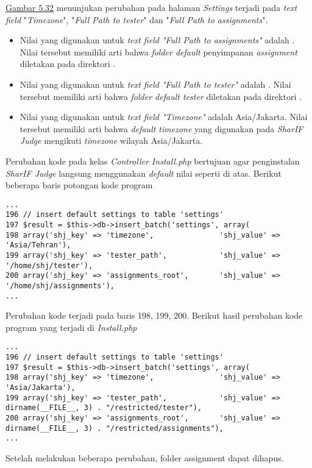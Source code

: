 	\hyperref[fig:set]{Gambar 5.32} menunjukan perubahan pada halaman \textit{Settings} terjadi pada \textit{text field} "\textit{Timezone}", "\textit{Full Path to tester}" dan "\textit{Full Path to assignments}". 
	\begin{itemize}
		\item Nilai yang digunakan untuk\textit{ text field "Full Path to assignments"} adalah . Nilai tersebut memiliki arti bahwa \textit{folder default} penyimpanan \textit{assignment} diletakan pada direktori .
		\item Nilai yang digunakan untuk \textit{text field "Full Path to tester"} adalah . Nilai tersebut memiliki arti bahwa \textit{folder default tester} diletakan pada direktori .
		\item Nilai yang digunakan untuk \textit{text field "Timezone"} adalah Asia/Jakarta. Nilai tersebut memiliki arti bahwa \textit{default timezone} yang digunakan pada \textit{SharIF Judge} mengikuti \textit{timezone} wilayah Asia/Jakarta.
	\end{itemize}
	
	Perubahan kode pada kelas \textit{Controller Install.php} bertujuan agar penginstalan \textit{SharIF Judge} langsung menggunakan \textit{default} nilai seperti di atas. Berikut beberapa baris potongan kode program
\begin{lstlisting}[basicstyle=\ttfamily, frame=single,
columns=fullflexible, keepspaces=true, breaklines=true]
...
196	// insert default settings to table 'settings'
197	$result = $this->db->insert_batch('settings', array(
198	array('shj_key' => 'timezone',               'shj_value' => 'Asia/Tehran'),
199	array('shj_key' => 'tester_path',            'shj_value' => '/home/shj/tester'),
200	array('shj_key' => 'assignments_root',       'shj_value' => '/home/shj/assignments'),
...
\end{lstlisting}
	Perubahan kode terjadi pada baris 198, 199, 200. Berikut hasil perubahan kode program yang terjadi di \textit{Install.php}
\begin{lstlisting}[basicstyle=\ttfamily, frame=single,
columns=fullflexible, keepspaces=true, breaklines=true]
...
196	// insert default settings to table 'settings'
197	$result = $this->db->insert_batch('settings', array(
198	array('shj_key' => 'timezone',               'shj_value' => 'Asia/Jakarta'),
199	array('shj_key' => 'tester_path',            'shj_value' => dirname(__FILE__, 3) . "/restricted/tester"),
200	array('shj_key' => 'assignments_root',       'shj_value' => dirname(__FILE__, 3) . "/restricted/assignments"),
...
\end{lstlisting}
	Setelah melakukan beberapa perubahan, folder assignment dapat dihapus.
	
